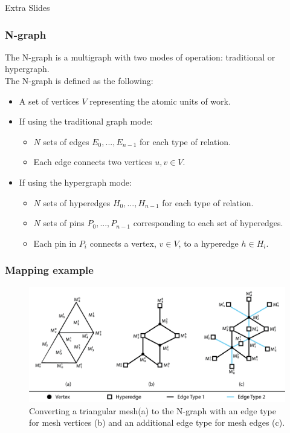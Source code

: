 \documentclass{beamer}
\begin{document}
\begin{frame}
  \center \huge Extra Slides
\end{frame}

\begin{frame}
  \frametitle{N-graph}
  The N-graph is a multigraph with two modes of operation: traditional or hypergraph.\\
  \smallskip
  The N-graph is defined as the following:
  \begin{itemize}
  \item A set of vertices $V$ representing the atomic units of work.
  \item If using the traditional graph mode:
    \begin{itemize}
    \item $N$ sets of edges $E_0,...,E_{n-1}$ for each type of relation.
    \item Each edge connects two vertices $u,v \in V$.
    \end{itemize}
  \item If using the hypergraph mode:
    \begin{itemize}
    \item $N$ sets of hyperedges $H_0,...,H_{n-1}$ for each type of relation.
    \item $N$ sets of pins $P_0,...,P_{n-1}$ corresponding to each set of hyperedges.
    \item Each pin in $P_i$ connects a vertex, $v \in V$, to a hyperedge $h \in H_i$.
    \end{itemize}
  \end{itemize}
\end{frame}

\begin{frame}
  \frametitle{Mapping example}
  \begin{figure}
    \centering
    \includegraphics[width=.9\textwidth]{figures/exampleMesh2Graph.png}
    \caption{Converting a triangular mesh(a) to the N-graph with an edge type for mesh vertices (b) and an additional edge type for mesh edges (c).}
  \end{figure}
\end{frame}
\end{document}

